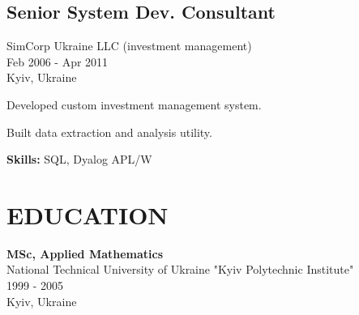 \documentclass[a4paper,10pt]{article}
\begin{document}
\subsection*{Senior System Dev. Consultant}
SimCorp Ukraine LLC (investment management) \\
Feb 2006 - Apr 2011 \\
Kyiv, Ukraine
\begin{bulletlist}
    \item Developed custom investment management system.
    \item Built data extraction and analysis utility.
\end{bulletlist}
\textbf{Skills:} SQL, Dyalog APL/W

\section*{EDUCATION}
\textbf{MSc, Applied Mathematics} \\
National Technical University of Ukraine "Kyiv Polytechnic Institute" \\
1999 - 2005 \\
Kyiv, Ukraine
\end{document}
